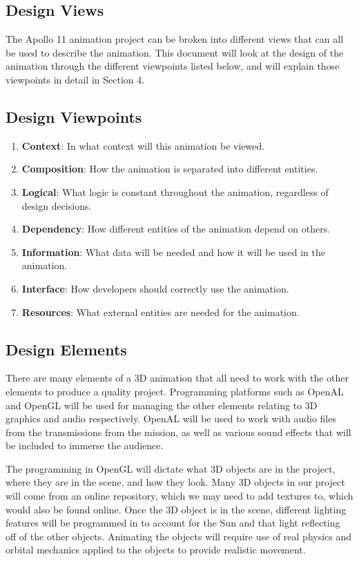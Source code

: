 \documentclass[onecolumn, draftclsnofoot,10pt, compsoc]{IEEEtran}
\begin{document}
\subsection{Design Views}
    The Apollo 11 animation project can be broken into different views that can all be used to describe the animation. This document will look at the design of the animation through the different viewpoints listed below, and will explain those viewpoints in detail in Section 4. 
    
    \subsection{Design Viewpoints}
    \begin{enumerate}
        \item \textbf{Context}: In what context will this animation be viewed.
        \item \textbf{Composition}: How the animation is separated into different entities.
        \item \textbf{Logical}: What logic is constant throughout the animation, regardless of design decisions.
        \item \textbf{Dependency}: How different entities of the animation depend on others.
        \item \textbf{Information}: What data will be needed and how it will be used in the animation. 
        \item \textbf{Interface}: How developers should correctly use the animation.
        \item \textbf{Resources}: What external entities are needed for the animation. 
    \end{enumerate}
    
    \subsection{Design Elements}
    There are many elements of a 3D animation that all need to work with the other elements to produce a quality project. Programming platforms such as OpenAL and OpenGL will be used for managing the other elements relating to 3D graphics and audio respectively. OpenAL will be used to work with audio files from the transmissions from the mission, as well as various sound effects that will be included to immerse the audience. 
    
    The programming in OpenGL will dictate what 3D objects are in the project, where they are in the scene, and how they look. Many 3D objects in our project will come from an online repository, which we may need to add textures to, which would also be found online. Once the 3D object is in the scene, different lighting features will be programmed in to account for the Sun and that light reflecting off of the other objects. Animating the objects will require use of real physics and orbital mechanics applied to the objects to provide realistic movement. 
    
\end{document}

